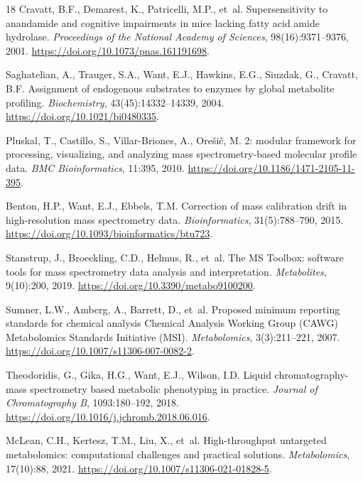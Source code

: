 \documentclass[11pt,twoside,openright]{book}
\begin{document}
\begin{thebibliography}{18}
Cravatt, B.F., Demarest, K., Patricelli, M.P., et~al.
\newblock Supersensitivity to anandamide and cognitive impairments in mice lacking fatty acid amide hydrolase.
\newblock \emph{Proceedings of the National Academy of Sciences}, 98(16):9371--9376, 2001.
\newblock \url{https://doi.org/10.1073/pnas.161191698}.

Saghatelian, A., Trauger, S.A., Want, E.J., Hawkins, E.G., Siuzdak, G., Cravatt, B.F.
\newblock Assignment of endogenous substrates to enzymes by global metabolite profiling.
\newblock \emph{Biochemistry}, 43(45):14332--14339, 2004.
\newblock \url{https://doi.org/10.1021/bi0480335}.

Pluskal, T., Castillo, S., Villar-Briones, A., Ore{\v{s}}i{\v{c}}, M.
 2: modular framework for processing, visualizing, and analyzing mass spectrometry-based molecular profile data.
\newblock \emph{BMC Bioinformatics}, 11:395, 2010.
\newblock \url{https://doi.org/10.1186/1471-2105-11-395}.

Benton, H.P., Want, E.J., Ebbels, T.M.
\newblock Correction of mass calibration drift in high-resolution mass spectrometry data.
\newblock \emph{Bioinformatics}, 31(5):788--790, 2015.
\newblock \url{https://doi.org/10.1093/bioinformatics/btu723}.

Stanstrup, J., Broeckling, C.D., Helmus, R., et~al.
\newblock The {MS} {Toolbox}: software tools for mass spectrometry data analysis and interpretation.
\newblock \emph{Metabolites}, 9(10):200, 2019.
\newblock \url{https://doi.org/10.3390/metabo9100200}.

Sumner, L.W., Amberg, A., Barrett, D., et~al.
\newblock Proposed minimum reporting standards for chemical analysis Chemical Analysis Working Group ({CAWG}) Metabolomics Standards Initiative ({MSI}).
\newblock \emph{Metabolomics}, 3(3):211--221, 2007.
\newblock \url{https://doi.org/10.1007/s11306-007-0082-2}.

Theodoridis, G., Gika, H.G., Want, E.J., Wilson, I.D.
\newblock Liquid chromatography-mass spectrometry based metabolic phenotyping in practice.
\newblock \emph{Journal of Chromatography B}, 1093:180--192, 2018.
\newblock \url{https://doi.org/10.1016/j.jchromb.2018.06.016}.

McLean, C.H., Kertesz, T.M., Liu, X., et~al.
\newblock High-throughput untargeted metabolomics: computational challenges and practical solutions.
\newblock \emph{Metabolomics}, 17(10):88, 2021.
\newblock \url{https://doi.org/10.1007/s11306-021-01828-5}.


\end{thebibliography}
\end{document}
